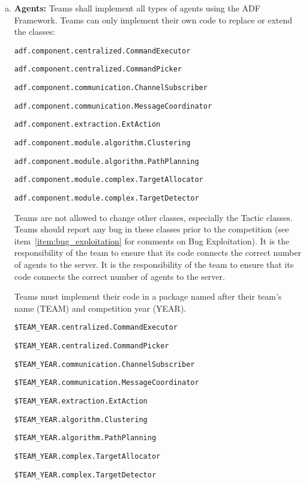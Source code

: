 \documentclass{article}
\begin{document}
\begin{enumerate}[(a)]
\item \textbf{Agents:} Teams shall implement all types of agents using the ADF Framework. Teams can only implement their own code to replace or extend the classes:

\small
\texttt{adf.component.centralized.CommandExecutor}

\texttt{adf.component.centralized.CommandPicker}

\texttt{adf.component.communication.ChannelSubscriber}

\texttt{adf.component.communication.MessageCoordinator}

\texttt{adf.component.extraction.ExtAction}

\texttt{adf.component.module.algorithm.Clustering}

\texttt{adf.component.module.algorithm.PathPlanning}

\texttt{adf.component.module.complex.TargetAllocator}

\texttt{adf.component.module.complex.TargetDetector}

\normalsize
Teams are not allowed to change other classes, especially the Tactic classes. Teams should report any bug in these classes prior to the competition (see item~\ref{item:bug_exploitation} for comments on Bug Exploitation). It is the responsibility of the team to ensure that its code connects the correct number of agents to the server. It is the responsibility of the team to ensure that its code connects the correct number of agents to the server.

Teams must implement their code in a package named after their team's name (TEAM) and competition year (YEAR).

\small

\texttt{\$TEAM\_YEAR.centralized.CommandExecutor}

\texttt{\$TEAM\_YEAR.centralized.CommandPicker}

\texttt{\$TEAM\_YEAR.communication.ChannelSubscriber}

\texttt{\$TEAM\_YEAR.communication.MessageCoordinator}

\texttt{\$TEAM\_YEAR.extraction.ExtAction}

\texttt{\$TEAM\_YEAR.algorithm.Clustering}

\texttt{\$TEAM\_YEAR.algorithm.PathPlanning}

\texttt{\$TEAM\_YEAR.complex.TargetAllocator}

\texttt{\$TEAM\_YEAR.complex.TargetDetector}


\end{enumerate}
\end{document}
